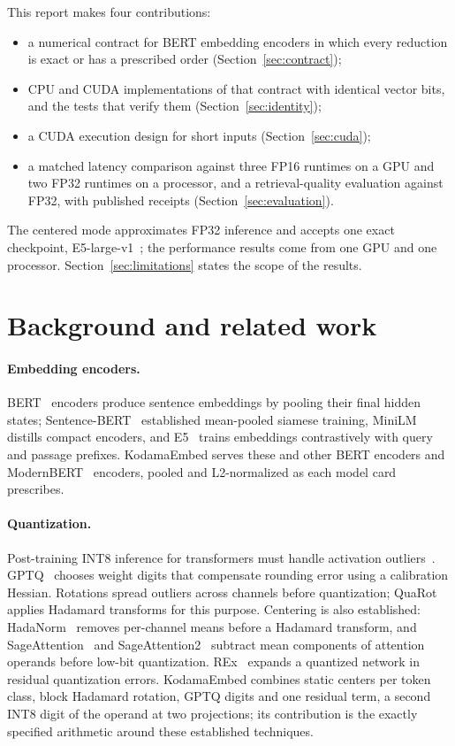 \documentclass[10pt]{article}
\begin{document}
This report makes four contributions:
\begin{itemize}
\item a numerical contract for BERT embedding encoders in which every
  reduction is exact or has a prescribed order (Section~\ref{sec:contract});
\item CPU and CUDA implementations of that contract with identical vector
  bits, and the tests that verify them (Section~\ref{sec:identity});
\item a CUDA execution design for short inputs (Section~\ref{sec:cuda});
\item a matched latency comparison against three FP16 runtimes on a GPU and
  two FP32 runtimes on a processor, and a retrieval-quality evaluation
  against FP32, with published receipts (Section~\ref{sec:evaluation}).
\end{itemize}

The centered mode approximates FP32 inference and accepts one exact
checkpoint, E5-large-v1~\cite{wang2022e5}; the performance results come from
one GPU and one processor. Section~\ref{sec:limitations} states the scope of
the results.

\section{Background and related work}

\paragraph{Embedding encoders.}
BERT~\cite{devlin2019} encoders produce sentence embeddings by pooling their
final hidden states; Sentence-BERT~\cite{reimers2019} established mean-pooled
siamese training, MiniLM~\cite{wang2020minilm} distills compact encoders, and
E5~\cite{wang2022e5} trains embeddings contrastively with query and passage
prefixes. KodamaEmbed serves these and other BERT encoders and
ModernBERT~\cite{warner2025} encoders, pooled and L2-normalized as each model
card prescribes.

\paragraph{Quantization.}
Post-training INT8 inference for transformers must handle activation
outliers~\cite{dettmers2022,xiao2023}. GPTQ~\cite{frantar2023} chooses weight
digits that compensate rounding error using a calibration Hessian.
Rotations spread outliers across channels before quantization;
QuaRot~\cite{ashkboos2024} applies Hadamard transforms for this purpose.
Centering is also established: HadaNorm~\cite{federici2025} removes per-channel
means before a Hadamard transform, and SageAttention~\cite{zhang2025sage}
and SageAttention2~\cite{zhang2025sage2} subtract mean components of attention
operands before low-bit quantization. REx~\cite{yvinec2023} expands a
quantized network in residual quantization errors. KodamaEmbed combines static
centers per token class, block Hadamard rotation, GPTQ digits and one residual
term, a second INT8 digit of the operand at two projections; its contribution
is the exactly specified arithmetic around these established techniques.
\end{document}
